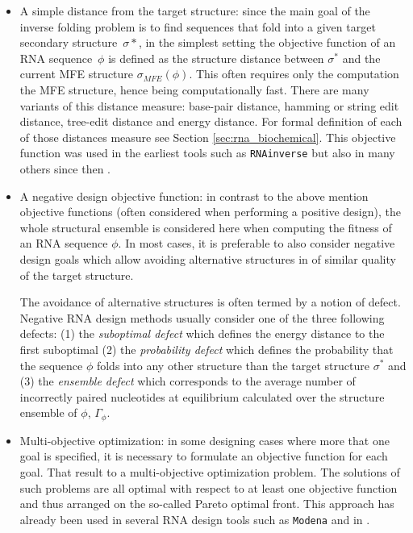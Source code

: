 \begin{itemize}
	\item
	A simple distance from the target structure: since the main goal of the inverse folding problem is to find sequences that fold into a given target secondary structure~\(\sigma*\), in the simplest setting the objective function of an RNA sequence~\(\phi\) is defined as the structure distance between $\sigma^*$ and the current MFE structure $\sigma_{MFE} (\phi)$. This often requires only the computation the MFE structure, hence being computationally fast. There are many variants of this distance measure: base-pair distance, hamming or string edit distance, tree-edit distance and energy distance. For formal definition of each of those distances measure see Section \ref{sec:rna_biochemical}. This objective function was used in the earliest tools such as \texttt{RNAinverse} \cite{hofacker1994fast} but also in many others since then \cite{andronescu2004new, busch2006info, gao2010inverse} . 
	
	\item A negative design objective function: in contrast to the above mention objective functions (often considered when performing a positive design), the whole structural ensemble is considered here when computing the fitness of an RNA sequence $\phi$. In most cases, it is preferable to also consider negative design goals which allow avoiding alternative structures in of similar quality of the target structure.
	
	The avoidance of alternative structures is often termed by a notion of defect. Negative RNA design methods
	usually consider one of the three following defects: (1)  the \textit{suboptimal defect} \cite{hofacker1994fast, flamm2001design, dirks2003partition, zadeh2011nupack} which defines the energy distance to the first suboptimal (2) the \textit{probability defect} \cite{zadeh2011nupack, hofacker1994fast} which defines the probability that the sequence $\phi$ folds into any other structure than the target structure $\sigma^*$  and (3) the \textit{ensemble defect} \cite{zadeh2011nupack} which corresponds to the average number of incorrectly paired nucleotides at equilibrium calculated over the structure ensemble of $\phi$, $\Gamma_{\phi}$. 
	
	\item Multi-objective optimization: in some designing cases where more that one goal is specified, it is necessary to formulate an objective function for each goal. That result to a multi-objective optimization problem.  The solutions of such problems are all optimal with respect to at least one objective function and thus arranged on the so-called Pareto optimal front. This approach has already been used in several RNA design tools such as \texttt{Modena} \cite{modena_2012, taneda2015multi} and in \cite{ramlan2011design}.
	

\end{itemize}
